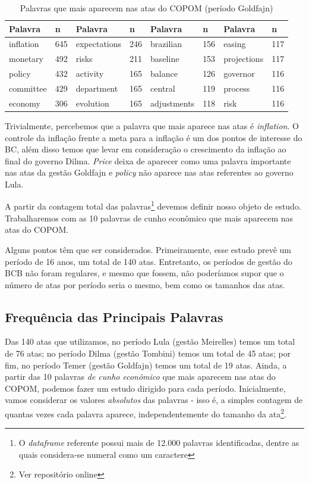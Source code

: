 \begin{table}[!h]
\centering
\caption{Palavras que mais aparecem nas atas do COPOM (período Goldfajn)}
\begin{tabular}{llllllll}
  \hline
Palavra & n & Palavra & n & Palavra & n & Palavra & n \\ 
  \hline
inflation & 645 & expectations & 246 & brazilian & 156 & easing & 117 \\ 
  monetary & 492 & risks & 211 & baseline & 153 & projections & 117 \\ 
  policy & 432 & activity & 165 & balance & 126 & governor & 116 \\ 
  committee & 429 & department & 165 & central & 119 & process & 116 \\ 
  economy & 306 & evolution & 165 & adjustments & 118 & risk & 116 \\ 
   \hline
\end{tabular}
\label{tab:contian}
\end{table}

Trivialmente, percebemos que a palavra que mais aparece nas atas é \textit{inflation}. O controle da inflação frente a meta para a inflação é um dos pontos de interesse do BC, além disso temos que levar em consideração o crescimento da inflação ao final do governo Dilma. \textit{Price} deixa de aparecer como uma palavra importante nas atas da gestão Goldfajn e \textit{policy} não aparece nas atas referentes ao governo Lula.

A partir da contagem total das palavras\footnote{O \textit{dataframe} referente possui mais de 12.000 palavras identificadas, dentre as quais considera-se numeral como um caractere} devemos definir nosso objeto de estudo. Trabalharemos com as 10 palavras de cunho econômico que mais aparecem nas atas do COPOM.

Alguns pontos têm que ser considerados. Primeiramente, esse estudo prevê um período de 16 anos, um total de 140 atas. Entretanto, os períodos de gestão do BCB não foram regulares, e mesmo que fossem, não poderíamos supor que o número de atas por período seria o mesmo, bem como os tamanhos das atas.

\subsection{Frequência das Principais Palavras}

Das 140 atas que utilizamos, no período Lula (gestão Meirelles) temos um total de 76 atas; no período Dilma (gestão Tombini) temos um total de 45 atas; por fim, no período Temer (gestão Goldfajn) temos um total de 19 atas. Ainda, a partir das 10 palavras \textit{de cunho econômico} que mais aparecem nas atas do COPOM, podemos fazer um estudo dirigido para cada período. Inicialmente, vamos considerar os valores \textit{absolutos} das palavras - isso é, a simples contagem de quantas vezes cada palavra aparece, independentemente do tamanho da ata\footnote{Ver repositório online}. 

